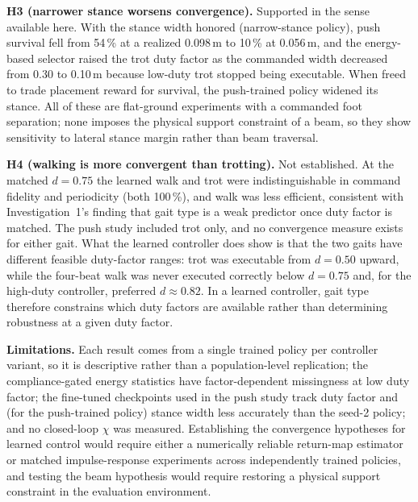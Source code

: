 \textbf{H3 (narrower stance worsens convergence).} Supported in the sense
available here. With the stance width honored (narrow-stance policy), push
survival fell from 54\,\% at a realized 0.098\,m to 10\,\% at 0.056\,m, and
the energy-based selector raised the trot duty factor as the commanded width
decreased from 0.30 to 0.10\,m because low-duty trot stopped being
executable. When freed to trade placement reward for survival, the
push-trained policy widened its stance. All of these are flat-ground
experiments with a commanded foot separation; none imposes the physical
support constraint of a beam, so they show sensitivity to lateral stance
margin rather than beam traversal.

\textbf{H4 (walking is more convergent than trotting).} Not established.
At the matched $d=0.75$ the learned walk and trot were indistinguishable in
command fidelity and periodicity (both 100\,\%), and walk was less efficient,
consistent with Investigation~1's finding that gait type is a weak predictor
once duty factor is matched. The push study included trot only, and no
convergence measure exists for either gait. What the learned controller does
show is that the two gaits have different feasible duty-factor ranges: trot
was executable from $d=0.50$ upward, while the four-beat walk was never
executed correctly below $d=0.75$ and, for the high-duty controller, preferred
$d\approx0.82$. In a learned controller, gait type therefore constrains which
duty factors are available rather than determining robustness at a given duty
factor.

\textbf{Limitations.} Each result comes from a single trained policy per
controller variant, so it is descriptive rather than a population-level
replication; the compliance-gated energy statistics have factor-dependent
missingness at low duty factor; the fine-tuned checkpoints used in the push
study track duty factor and (for the push-trained policy) stance width less
accurately than the seed-2 policy; and no closed-loop $\chi$ was measured.
Establishing the convergence hypotheses for learned control would require
either a numerically reliable return-map estimator or matched impulse-response
experiments across independently trained policies, and testing the beam
hypothesis would require restoring a physical support constraint in the
evaluation environment.
